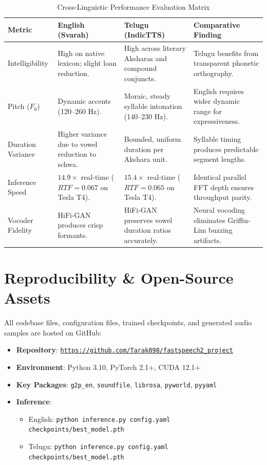 \documentclass[10pt,twocolumn,a4paper]{article}
\begin{document}
\begin{table}[t]
\centering
\small
\caption{Cross-Linguistic Performance Evaluation Matrix}
\label{tab:comp_matrix}
\begin{tabularx}{\textwidth}{lXXX}
\toprule
\textbf{Metric} & \textbf{English (Svarah)} & \textbf{Telugu (IndicTTS)} & \textbf{Comparative Finding} \\
\midrule
Intelligibility & High on native lexicon; slight loan reduction. & High across literary Aksharas and compound conjuncts. & Telugu benefits from transparent phonetic orthography. \\
Pitch ($F_0$) & Dynamic accents (120--260 Hz). & Moraic, steady syllable intonation (140--230 Hz). & English requires wider dynamic range for expressiveness. \\
Duration Variance & Higher variance due to vowel reduction to schwa. & Bounded, uniform duration per Akshara unit. & Syllable timing produces predictable segment lengths. \\
Inference Speed & $14.9\times$ real-time ($RTF = 0.067$ on Tesla T4). & $15.4\times$ real-time ($RTF = 0.065$ on Tesla T4). & Identical parallel FFT depth ensures throughput parity. \\
Vocoder Fidelity & HiFi-GAN produces crisp formants. & HiFi-GAN preserves vowel duration ratios accurately. & Neural vocoding eliminates Griffin-Lim buzzing artifacts. \\
\bottomrule
\end{tabularx}
\end{table}

\section{Reproducibility \& Open-Source Assets}

All codebase files, configuration files, trained checkpoints, and generated audio samples are hosted on GitHub:
\begin{itemize}[noitemsep]
    \item \textbf{Repository}: \href{https://github.com/Tarak098/fastspeech2_project}{\texttt{https://github.com/Tarak098/fastspeech2\_project}}
    \item \textbf{Environment}: Python 3.10, PyTorch 2.1+, CUDA 12.1+
    \item \textbf{Key Packages}: \texttt{g2p\_en}, \texttt{soundfile}, \texttt{librosa}, \texttt{pyworld}, \texttt{pyyaml}
    \item \textbf{Inference}:
    \begin{itemize}[noitemsep]
        \item English: \texttt{python inference.py config.yaml checkpoints/best\_model.pth}
        \item Telugu: \texttt{python inference.py config.yaml checkpoints/best\_model.pth}
    \end{itemize}
\end{itemize}
\end{document}
